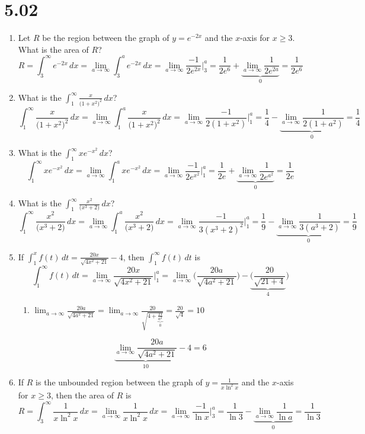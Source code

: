 \documentclass[12pt]{article}
\begin{document}
\section*{5.02}
\begin{enumerate}
    \item Let $R$ be the region between the graph of $y=e^{-2x}$ and the $x$-axis for $x\geq3$. What is the area of $R$?
    $$R=\int_{3}^{\infty} e^{-2x}\, dx =\lim_{a\to\infty} \int_{3}^{a} e^{-2x}\, dx = \lim_{a\to\infty} \frac{-1}{2e^{2x}}\biggr\rvert_{3}^{a} =\frac{1}{2e^6}+\underbrace{\lim_{a\to\infty} \frac{1}{2e^{2a}}}_{0} = \boxed{\frac{1}{2e^6}}$$
    
    \item What is the $\int_{1}^{\infty} \frac{x}{\big(1+x^2\big)^2}\, dx$?
    $$\int_{1}^{\infty} \frac{x}{\big(1+x^2\big)^2}\, dx = \lim_{a\to\infty} \int_{1}^{a}\frac{x}{\big(1+x^2\big)^2}\, dx = \lim_{a\to\infty} \frac{-1}{2(1+x^2)}\biggr\rvert_{1}^{a} = \frac{1}{4}-\underbrace{\lim_{a\to\infty}\frac{1}{2(1+a^2)} }_{0} = \boxed{\frac{1}{4}}$$
    \item What is the $\int_{1}^{\infty} xe^{-x^2} \, dx$?
    $$\int_{1}^{\infty} xe^{-x^2} \, dx = \lim_{a\to\infty}\int_{1}^{a} xe^{-x^2} \, dx = \lim_{a\to\infty} \frac{-1}{2e^{x^2}}\biggr\rvert_{1}^{a} = \frac{1}{2e}+\underbrace{\lim_{a\to\infty}\frac{1}{2e^{a^2}}}_{0} =\boxed{\frac{1}{2e}}$$
    \item What is the $\int_{1}^{\infty} \frac{x^2}{\big(x^3+2\big)}\, dx$?
$$\int_{1}^{\infty} \frac{x^2}{\big(x^3+2\big)} \, dx = \lim_{a\to\infty}\int_{1}^{a} \frac{x^2}{\big(x^3+2\big)} \, dx = \lim_{a\to\infty} \frac{-1}{3(x^3+2)^2}\biggr\rvert_{1}^{a} = \frac{1}{9}-\underbrace{\lim_{a\to\infty}\frac{1}{3(a^3+2)}}_{0} =\boxed{\frac{1}{9}}$$
    
    \item If $\int_{1}^{x} f(t)\,dt = \frac{20x}{\sqrt{4x^2+21}}-4$, then $\int_{1}^{\infty} f(t)\,dt$ is
   $$\int_{1}^{\infty} f(t)\,dt= \lim_{a\to\infty}\frac{20x}{\sqrt{4x^2+21}} \biggr\rvert_{1}^{a} = \lim_{a\to \infty} \biggr(\frac{20a}{\sqrt{4a^2+21}} \biggr) -\underbrace{\biggr(\frac{20}{\sqrt{21+4}}}_{4} \biggr)$$
   \begin{enumerate}
       \item $\lim_{a\to \infty}\frac{20a}{\sqrt{4a^2+21}} = \lim_{a\to \infty}\frac{20}{\sqrt{4+\underbrace{\frac{21}{a^2}}_{0}}} = \frac{20}{\sqrt{4}}=10$
    
   \end{enumerate}
   $$ \underbrace{\lim_{a\to \infty}\frac{20a}{\sqrt{4a^2+21}}}_{10}-4=\boxed{6} $$
    \item If $R$ is the unbounded region between the graph of $y=\frac{1}{x\ln^2 x}$ and the $x$-axis for $x\geq3$, then the area of $R$ is
 $$R=\int_{3}^{\infty} \frac{1}{x\ln^2 x}\, dx =\lim_{a\to\infty} \frac{1}{x\ln^2 x}\, dx = \lim_{a\to\infty} \frac{-1}{\ln x}\biggr\rvert_{3}^{a} =\frac{1}{\ln 3}-\underbrace{\lim_{a\to\infty} \frac{1}{\ln a}}_{0} = \boxed{\frac{1}{\ln 3}}$$
    

\end{enumerate}
\end{document}

